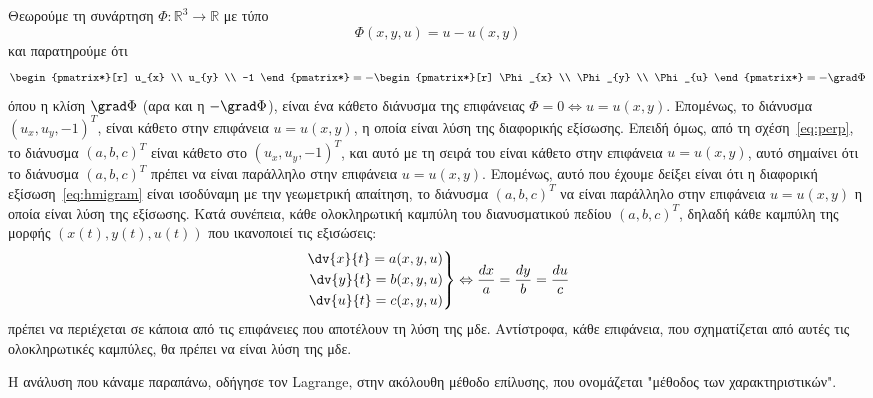 Θεωρούμε τη συνάρτηση $ \Phi \colon \mathbb{R}^{3} \to \mathbb{R} $ με τύπο 
\[
  \Phi(x,y,u)=u-u(x,y) 
\] 
και παρατηρούμε ότι 
\[
  \begin{pmatrix*}[r] u_{x} \\ u_{y} \\ -1 \end{pmatrix*} = -
  \begin{pmatrix*}[r] \Phi _{x} \\ \Phi _{y} \\ \Phi _{u} \end{pmatrix*} = 
  - \grad \Phi 
\]
όπου η κλίση $ \grad \Phi $ (αρα και η $ - \grad \Phi $), είναι ένα κάθετο διάνυσμα 
της επιφάνειας $ \Phi = 0 \Leftrightarrow u=u(x,y) $. Επομένως, το διάνυσμα 
$ (u_{x},u_{y},-1)^{T} $, είναι κάθετο στην επιφάνεια $ u=u(x,y) $, η οποία είναι 
λύση της διαφορικής εξίσωσης.
Επειδή όμως, από τη σχέση~\eqref{eq:perp}, το διάνυσμα $ (a,b,c)^{T} $ 
είναι κάθετο στο $ (u_{x},u_{y},-1)^{T} $, και αυτό με τη σειρά του είναι κάθετο 
στην επιφάνεια $ u=u(x,y) $, αυτό σημαίνει ότι το διάνυσμα 
$ (a,b,c)^{T} $ πρέπει να είναι παράλληλο στην επιφάνεια $ u=u(x,y) $. Επομένως, 
αυτό που έχουμε δείξει είναι ότι η διαφορική εξίσωση~\eqref{eq:hmigram} είναι 
ισοδύναμη με την γεωμετρική απαίτηση, το διάνυσμα $ (a,b,c)^{T} $ να είναι παράλληλο
στην επιφάνεια $ u=u(x,y) $ η οποία είναι λύση της εξίσωσης. 
Κατά συνέπεια, κάθε ολοκληρωτική καμπύλη του διανυσματικού πεδίου $ (a,b,c)^{T} $,
δηλαδή κάθε καμπύλη της μορφής $ (x(t),y(t),u(t)) $ που ικανοποιεί τις εξισώσεις:
\[
  \left.
    \begin{aligned}
  \dv{x}{t} = a(x,y,u) \\
  \dv{y}{t} = b(x,y,u) \\
  \dv{u}{t} = c(x,y,u) 
    \end{aligned} 
  \right\} \Leftrightarrow 
  \frac{dx}{a} = \frac{dy}{b} = \frac{du}{c}
 \]
πρέπει να περιέχεται σε κάποια από τις επιφάνειες που αποτέλουν τη λύση της μδε. 
Αντίστροφα, κάθε επιφάνεια, που σχηματίζεται από αυτές τις ολοκληρωτικές καμπύλες, 
θα πρέπει να είναι λύση της μδε.

Η ανάλυση που κάναμε παραπάνω, οδήγησε τον Lagrange, στην ακόλουθη μέθοδο επίλυσης, 
που ονομάζεται "μέθοδος των χαρακτηριστικών". 

